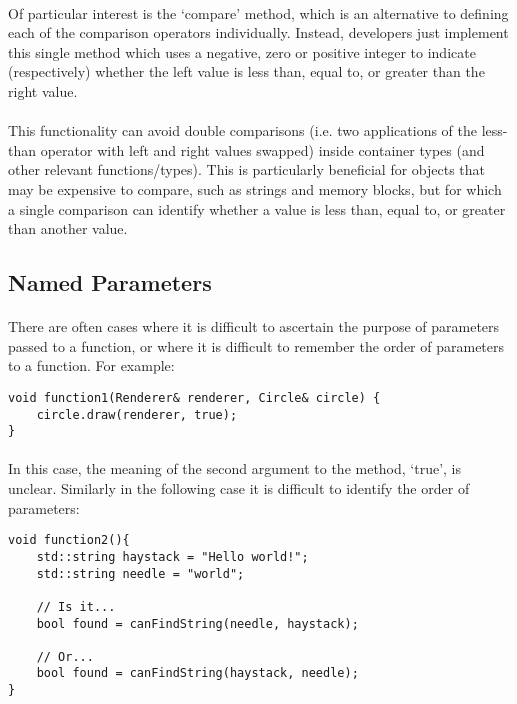 \documentclass[12pt,twoside,notitlepage]{report}
\begin{document}
\paragraph{}
Of particular interest is the `compare' method, which is an alternative to defining each of the comparison operators individually. Instead, developers just implement this single method which uses a negative, zero or positive integer to indicate (respectively) whether the left value is less than, equal to, or greater than the right value.

\paragraph{}
This functionality can avoid double comparisons (i.e. two applications of the less-than operator with left and right values swapped) inside container types (and other relevant functions/types). This is particularly beneficial for objects that may be expensive to compare, such as strings and memory blocks, but for which a single comparison can identify whether a value is less than, equal to, or greater than another value.

\clearpage

\subsection{Named Parameters}

\paragraph{}
There are often cases where it is difficult to ascertain the purpose of parameters passed to a function, or where it is difficult to remember the order of parameters to a function. For example:

\begin{lstlisting}
void function1(Renderer& renderer, Circle& circle) {
	circle.draw(renderer, true);
}
\end{lstlisting}

\paragraph{}
In this case, the meaning of the second argument to the method, `true', is unclear. Similarly in the following case it is difficult to identify the order of parameters:

\begin{lstlisting}
void function2(){
	std::string haystack = "Hello world!";
	std::string needle = "world";
	
	// Is it...
	bool found = canFindString(needle, haystack);
	
	// Or...
	bool found = canFindString(haystack, needle);
}
\end{lstlisting}
\end{document}
